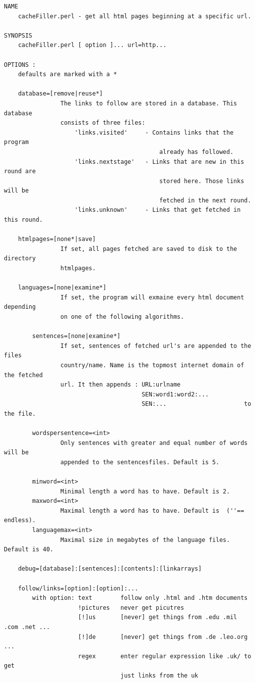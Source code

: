 {
\small
\begin{verbatim}
NAME
    cacheFiller.perl - get all html pages beginning at a specific url.

SYNOPSIS
    cacheFiller.perl [ option ]... url=http...

OPTIONS :
    defaults are marked with a *
	
    database=[remove|reuse*]
                The links to follow are stored in a database. This database
                consists of three files:
                    'links.visited'     - Contains links that the program 
                                            already has followed.
                    'links.nextstage'   - Links that are new in this round are
                                            stored here. Those links will be 
                                            fetched in the next round.
                    'links.unknown'     - Links that get fetched in this round.
       
    htmlpages=[none*|save]
                If set, all pages fetched are saved to disk to the directory
                htmlpages.
                
    languages=[none|examine*] 
                If set, the program will exmaine every html document depending 
                on one of the following algorithms.
    
        sentences=[none|examine*]
                If set, sentences of fetched url's are appended to the files 
                country/name. Name is the topmost internet domain of the fetched
                url. It then appends : URL:urlname
                                       SEN:word1:word2:...
                                       SEN:...                      to the file.
        
        wordspersentence=<int>
                Only sentences with greater and equal number of words will be 
                appended to the sentencesfiles. Default is 5.
        
        minword=<int>
                Minimal length a word has to have. Default is 2.
        maxword=<int>
                Maximal length a word has to have. Default is  (''== endless).
        languagemax=<int>
                Maximal size in megabytes of the language files. Default is 40.     

    debug=[database]:[sentences]:[contents]:[linkarrays]
        
    follow/links=[option]:[option]:...
        with option: text        follow only .html and .htm documents
                     !pictures   never get picutres
                     [!]us       [never] get things from .edu .mil .com .net ...
                     [!]de       [never] get things from .de .leo.org ...
                     regex       enter regular expression like .uk/ to get 
                                 just links from the uk
    

\end{verbatim}}
